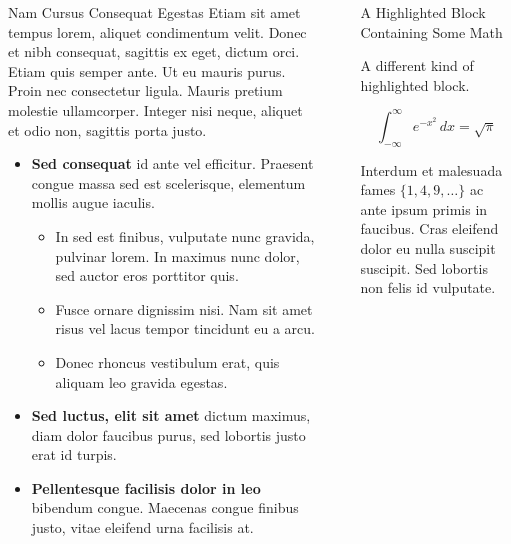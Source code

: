 \documentclass[final]{beamer}
\newlength{\sepwidth}
\newlength{\colwidth}
\newcommand{\separatorcolumn}{\begin{column}{\sepwidth}\end{column}}
\begin{document}
\begin{frame}[t]
\begin{columns}[t]
\begin{column}{\colwidth}
\begin{block}{Nam Cursus Consequat Egestas}
    Etiam sit amet tempus lorem, aliquet condimentum velit. Donec et nibh
    consequat, sagittis ex eget, dictum orci. Etiam quis semper ante. Ut eu
    mauris purus. Proin nec consectetur ligula. Mauris pretium molestie
    ullamcorper. Integer nisi neque, aliquet et odio non, sagittis porta justo.

    \begin{itemize}
      \item \textbf{Sed consequat} id ante vel efficitur. Praesent congue massa
        sed est scelerisque, elementum mollis augue iaculis.
        \begin{itemize}
          \item In sed est finibus, vulputate nunc gravida, pulvinar lorem. In maximus nunc dolor, sed auctor eros
            porttitor quis.
          \item Fusce ornare dignissim nisi. Nam sit amet risus vel lacus
            tempor tincidunt eu a arcu.
          \item Donec rhoncus vestibulum erat, quis aliquam leo
            gravida egestas.
        \end{itemize}
      \item \textbf{Sed luctus, elit sit amet} dictum maximus, diam dolor
        faucibus purus, sed lobortis justo erat id turpis.
      \item \textbf{Pellentesque facilisis dolor in leo} bibendum congue.
        Maecenas congue finibus justo, vitae eleifend urna facilisis at.
    \end{itemize}

  \end{block}

\end{column}

\separatorcolumn

\begin{column}{\colwidth}

  \begin{exampleblock}{A Highlighted Block Containing Some Math}

    A different kind of highlighted block.

    $$
    \int_{-\infty}^{\infty} e^{-x^2}\,dx = \sqrt{\pi}
    $$

    Interdum et malesuada fames $\{1, 4, 9, \ldots\}$ ac ante ipsum primis in
    faucibus. Cras eleifend dolor eu nulla suscipit suscipit. Sed lobortis non
    felis id vulputate.



\end{exampleblock}
\end{column}
\end{columns}
\end{frame}
\end{document}
